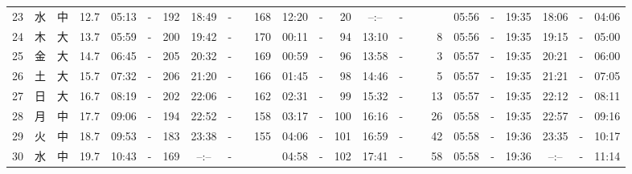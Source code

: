 \documentclass[12pt,a4j]{jsarticle}
\begin{document}
\begin{table}[htbp]
\begin{center}
{\begin{tabular}{|rc|cr|ccrccr|ccrccr|ccc|ccc|}
23 & 水 & 中 & 12.7 &  05:13 &-& 192 &  18:49 &-& 168 &  12:20 &-&  20 &  --:-- &-&~~~~~ & 05:56 & -& 19:35 & 18:06 & -& 04:06 \\
24 & 木 & 大 & 13.7 &  05:59 &-& 200 &  19:42 &-& 170 &  00:11 &-&  94 &  13:10 &-&   8 & 05:56 & -& 19:35 & 19:15 & -& 05:00 \\
25 & 金 & 大 & 14.7 &  06:45 &-& 205 &  20:32 &-& 169 &  00:59 &-&  96 &  13:58 &-&   3 & 05:57 & -& 19:35 & 20:21 & -& 06:00 \\
26 & 土 & 大 & 15.7 &  07:32 &-& 206 &  21:20 &-& 166 &  01:45 &-&  98 &  14:46 &-&   5 & 05:57 & -& 19:35 & 21:21 & -& 07:05 \\
27 & 日 & 大 & 16.7 &  08:19 &-& 202 &  22:06 &-& 162 &  02:31 &-&  99 &  15:32 &-&  13 & 05:57 & -& 19:35 & 22:12 & -& 08:11 \\
28 & 月 & 中 & 17.7 &  09:06 &-& 194 &  22:52 &-& 158 &  03:17 &-& 100 &  16:16 &-&  26 & 05:58 & -& 19:35 & 22:57 & -& 09:16 \\
29 & 火 & 中 & 18.7 &  09:53 &-& 183 &  23:38 &-& 155 &  04:06 &-& 101 &  16:59 &-&  42 & 05:58 & -& 19:36 & 23:35 & -& 10:17 \\
30 & 水 & 中 & 19.7 &  10:43 &-& 169 &  --:-- &-&~~~~~ &  04:58 &-& 102 &  17:41 &-&  58 & 05:58 & -& 19:36 & --:-- & -& 11:14 \\
   \hline
   \end{tabular}}
   \end{center}
\end{table}
\newpage
\end{document}
